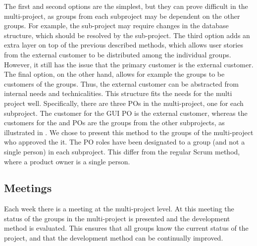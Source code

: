 \begin{description}
The first and second options are the simplest, but they can prove difficult in the multi-project, as groups from each subproject may be dependent on the other groups. For example, the \gui{} sub-project may require changes in the database structure, which should be resolved by the \db sub-project. The third option adds an extra layer on top of the previous described methods, which allows user stories from the external customer to be distributed among the individual groups. However, it still has the issue that the primary customer is the external customer. The final option, on the other hand, allows for example the \gui groups to be customers of the \bd groups. Thus, the external customer can be abstracted from internal needs and technicalities. This structure fits the needs for the multi project well. Specifically, there are three POs in the multi-project, one for each subproject. The customer for the GUI PO is the external customer, whereas the customers for the \db and \bd POs are the groups from the other subprojects, as illustrated in . We chose to present this method to the groups of the multi-project who approved the it. The PO roles have been designated to a group (and not a single person) in each subproject. This differ from the regular Scrum method, where a product owner is a single person.  

\end{description}


\subsection{Meetings}\label{sec:meetings}
Each week there is a meeting at the multi-project level. At this meeting the status of the groups in the multi-project is presented and the development method is evaluated. This ensures that all groups know the current status of the project, and that the development method can be continually improved.


